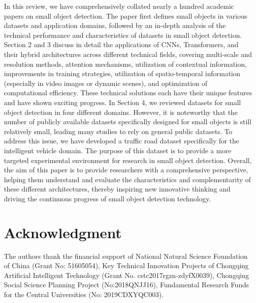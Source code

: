 \documentclass[journal]{IEEEtran}
\begin{document}
In this review, we have comprehensively collated nearly a hundred academic papers on small object detection. The paper first defines small objects in various datasets and application domains, followed by an in-depth analysis of the technical performance and characteristics of datasets in small object detection. Section 2 and 3 discuss in detail the applications of CNNs, Transformers, and their hybrid architectures across different technical fields, covering multi-scale and resolution methods, attention mechanisms, utilization of contextual information, improvements in training strategies, utilization of spatio-temporal information (especially in video images or dynamic scenes), and optimization of computational efficiency. These technical solutions each have their unique features and have shown exciting progress. In Section 4, we reviewed datasets for small object detection in four different domains. However, it is noteworthy that the number of publicly available datasets specifically designed for small objects is still relatively small, leading many studies to rely on general public datasets. To address this issue, we have developed a traffic road dataset specifically for the intelligent vehicle domain. The purpose of this dataset is to provide a more targeted experimental environment for research in small object detection. Overall, the aim of this paper is to provide researchers with a comprehensive perspective, helping them understand and evaluate the characteristics and complementarity of these different architectures, thereby inspiring new innovative thinking and driving the continuous progress of small object detection technology.

\section*{Acknowledgment}
The authors thank the financial support of National Natural Science Foundation of China (Grant No: 51605054), Key Technical Innovation Projects of Chongqing Artificial Intelligent Technology (Grant No. cstc2017rgzn-zdyfX0039), Chongqing Social Science Planning Project (No:2018QNJJ16), Fundamental Research Funds for the Central Universities (No: 2019CDXYQC003).


\end{document}

